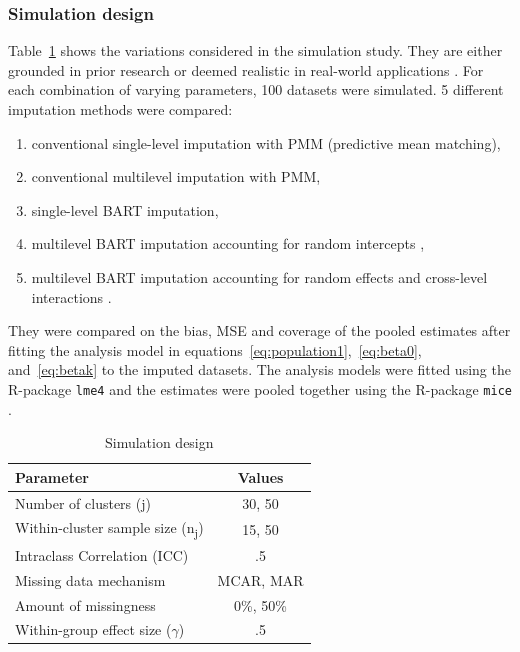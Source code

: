 \documentclass[10pt, a4paper, titlepage]{article}
\begin{document}
\subsubsection{Simulation design} 
Table~\ref{tab:simulationparameters} shows the variations considered in the simulation study. They are either grounded in prior research or deemed realistic in real-world applications \citep{gulliford1999, murray2003, hox2017, grund2018, enders2018a, enders2020}. For each combination of varying parameters, 100 datasets were simulated. 5 different imputation methods were compared: 
\begin{enumerate}
    \item conventional single-level imputation with PMM (predictive mean matching),
    \item conventional multilevel imputation with PMM,
    \item single-level BART imputation,
    \item multilevel BART imputation accounting for random intercepts \citep{chen2020, wagner2020, tan2016},
    \item multilevel BART imputation accounting for random effects and cross-level interactions \citep{dorie2022}.
\end{enumerate} They were compared on the bias, MSE and coverage of the pooled estimates after fitting the analysis model in equations~\ref{eq:population1},~\ref{eq:beta0}, and~\ref{eq:betak} to the imputed datasets. The analysis models were fitted using the R-package \texttt{lme4} \citep{bates2015} and the estimates were pooled together using the R-package \texttt{mice} \citep{buuren2011}.
\begin{table}
\centering
\caption{Simulation design}
\label{tab:simulationparameters}
\begin{tabular}{l|c}
        \textbf{Parameter}                                  & \textbf{Values} \\ \hline
        Number of clusters (j)                              & 30, 50 \\
        Within-cluster sample size (n\textsubscript{j})     & 15, 50 \\
        Intraclass Correlation (ICC)                        & .5 \\
        Missing data mechanism                              & MCAR, MAR \\
        Amount of missingness                               & 0\%, 50\% \\
        Within-group effect size ($\gamma$)                 & .5
\end{tabular}
\end{table} 
\end{document}

